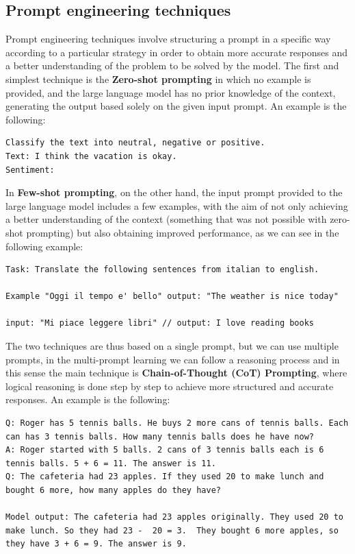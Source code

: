 \subsection{Prompt engineering techniques}
Prompt engineering techniques involve structuring a prompt in a specific way according to a particular strategy in order to obtain more accurate responses and a better understanding of the problem to be solved by the model. The first and simplest technique is the \textbf{Zero-shot prompting} in which no example is provided, and the large language model has no prior knowledge of the context, generating the output based solely on the given input prompt. An example is the following: 
\begin{lstlisting}
Classify the text into neutral, negative or positive. 
Text: I think the vacation is okay.
Sentiment:   
\end{lstlisting}
In \textbf{Few-shot prompting}, on the other hand, the input prompt provided to the large language model includes a few examples, with the aim of not only achieving a better understanding of the context (something that was not possible with zero-shot prompting) but also obtaining improved performance, as we can see in the following example:
\begin{lstlisting}
Task: Translate the following sentences from italian to english.

Example "Oggi il tempo e' bello" output: "The weather is nice today"

input: "Mi piace leggere libri" // output: I love reading books
\end{lstlisting}
The two techniques are thus based on a single prompt, but we can use multiple prompts, in the multi-prompt learning  
we can follow a reasoning process and in this sense the main technique is \textbf{Chain-of-Thought (CoT) Prompting}, where logical reasoning is done step by step to achieve more structured and accurate responses. An example is the following:
\begin{lstlisting}
Q: Roger has 5 tennis balls. He buys 2 more cans of tennis balls. Each can has 3 tennis balls. How many tennis balls does he have now? 
A: Roger started with 5 balls. 2 cans of 3 tennis balls each is 6 tennis balls. 5 + 6 = 11. The answer is 11.  
Q: The cafeteria had 23 apples. If they used 20 to make lunch and bought 6 more, how many apples do they have?

Model output: The cafeteria had 23 apples originally. They used 20 to make lunch. So they had 23 -  20 = 3.  They bought 6 more apples, so they have 3 + 6 = 9. The answer is 9.   
\end{lstlisting}
